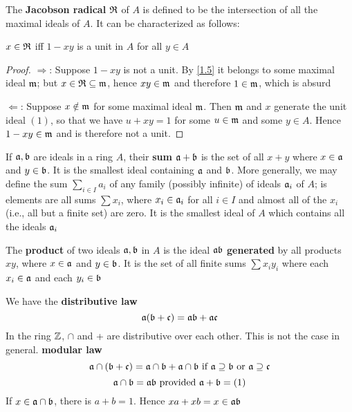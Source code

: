 \documentclass[11pt]{article}
\begin{document}
The \textbf{Jacobson radical} \(\mathfrak{R}\) of \(A\) is defined to be the intersection of all the maximal ideals
of \(A\). It can be characterized as follows:

\begin{proposition}[]
\label{1.9}
\(x\in\mathfrak{R}\) iff \(1-xy\) is a unit in \(A\) for all \(y\in A\)
\end{proposition}

\begin{proof}
\(\Rightarrow\): Suppose \(1-xy\) is not a unit. By \ref{1.5} it belongs to some maximal ideal \(\mathfrak{m}\);
but \(x\in\mathfrak{R}\subseteq\mathfrak{m}\), hence \(xy\in\mathfrak{m}\) and therefore \(1\in\mathfrak{m}\), which is absurd

\(\Leftarrow\): Suppose \(x\notin\mathfrak{m}\) for some maximal ideal \(\mathfrak{m}\). Then \(\mathfrak{m}\) and \(x\) generate the unit
ideal \((1)\), so that we have \(u+xy=1\) for some \(u\in\mathfrak{m}\) and some \(y\in A\). Hence \(1-xy\in\mathfrak{m}\)
and is therefore not a unit.
\end{proof}

If \(\mathfrak{a},\mathfrak{b}\) are ideals in a ring \(A\), their \textbf{sum} \(\mathfrak{a}+\mathfrak{b}\) is the set of all \(x+y\) where \(x\in\mathfrak{a}\)
and \(y\in\mathfrak{b}\). It is the smallest ideal containing \(\mathfrak{a}\) and \(\mathfrak{b}\). More generally, we may define
the sum \(\sum_{i\in I}a_i\) of any family (possibly infinite) of ideals \(\mathfrak{a}_i\) of \(A\); is elements
are all sums \(\sum x_i\), where \(x_i\in\mathfrak{a}_i\) for all \(i\in I\) and almost all of the \(x_i\) (i.e., all
but a finite set) are zero. It is the smallest ideal of \(A\) which contains all the ideals \(\mathfrak{a}_i\)

The \textbf{product} of two ideals \(\mathfrak{a},\mathfrak{b}\) in \(A\) is the ideal \(\mathfrak{a}\mathfrak{b}\) \textbf{generated} by all products \(xy\),
where \(x\in\mathfrak{a}\) and \(y\in\mathfrak{b}\). It is the set of all finite sums \(\sum x_iy_i\) where each \(x_i\in\mathfrak{a}\) and
each \(y_i\in\mathfrak{b}\)

We have the \textbf{distributive law}
\begin{equation*}
\mathfrak{a}(\mathfrak{b}+\mathfrak{c})=\mathfrak{a}\mathfrak{b}+\mathfrak{a}\mathfrak{c}
\end{equation*}
In the ring \(\mathbb{Z}\), \(\cap\) and + are distributive over each other. This is not the case in
general. \textbf{modular law}
\begin{equation*}
\mathfrak{a}\cap(\mathfrak{b}+\mathfrak{c})=\mathfrak{a}\cap\mathfrak{b}+\mathfrak{a}\cap\mathfrak{b}\text{ if }\mathfrak{a}\supseteq\mathfrak{b}\text{ or }\mathfrak{a}\supseteq\mathfrak{c}
\end{equation*}
\begin{equation*}
\mathfrak{a}\cap\mathfrak{b}=\mathfrak{a}\mathfrak{b}\text{ provided }\mathfrak{a}+\mathfrak{b}=(1)
\end{equation*}
If \(x\in\mathfrak{a}\cap\mathfrak{b}\), there is \(a+b=1\). Hence \(xa+xb=x\in\mathfrak{a}\mathfrak{b}\)
\end{document}
